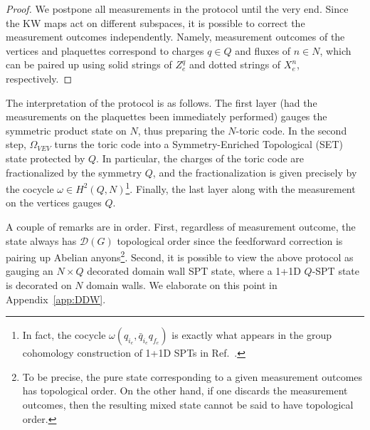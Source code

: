 \documentclass[nofootinbib,prx,twocolumn,showpacs,superscriptaddress,notitlepage,amsmath,amssymb]{revtex4-2}
\theoremstyle{definition}
\begin{document}
\begin{proof}
 We postpone all measurements in the protocol until the very end. Since the KW maps act on different subspaces, it is possible to correct the measurement outcomes independently. Namely, measurement outcomes of the vertices and plaquettes correspond to charges $q \in Q$ and fluxes of $n\in N$, which can be paired up using solid strings of $Z_e^q$ and dotted strings of $X_e^n$, respectively.
\end{proof}
The interpretation of the protocol is as follows. The first layer (had the measurements on the plaquettes been immediately performed) gauges the symmetric product state on $N$, thus preparing the $N$-toric code. In the second step, $\Omega_{VEV}$ turns the toric code into a Symmetry-Enriched Topological (SET) state protected by $Q$. In particular, the charges of the toric code are fractionalized by the symmetry $Q$, and the fractionalization is given precisely by the cocycle $\omega \in H^2(Q,N)$\footnote{In fact, the cocycle $\omega(q_{i_e},\bar q_{i_e}q_{f_e})$ is exactly what appears in the group cohomology construction of 1+1D SPTs in Ref.~.}. Finally, the last layer along with the measurement on the vertices gauges $Q$. 

A couple of remarks are in order. First, regardless of measurement outcome, the state always has $\mathcal D(G)$ topological order since the feedforward correction is pairing up Abelian anyons\footnote{To be precise, the pure state corresponding to a given measurement outcomes has topological order. On the other hand, if one discards the measurement outcomes, then the resulting mixed state cannot be said to have topological order. }. Second, it is possible to view the above protocol as gauging an $N\times Q$ decorated domain wall SPT state\cite{decorateddomainwalls}, where a 1+1D $Q$-SPT state is decorated on $N$ domain walls. We elaborate on this point in Appendix~\ref{app:DDW}.
\end{document}

